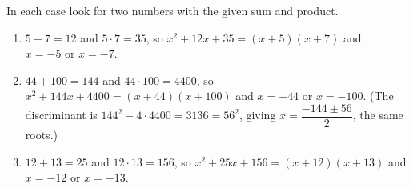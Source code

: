 In each case look for two numbers with the given sum and product.
\begin{enumerate}
\item[(a)] $5+7=12$ and $5\cdot7=35$, so $x^2+12x+35=(x+5)(x+7)$ and $\boxed{x=-5\text{ or }x=-7}$.
\item[(b)] $44+100=144$ and $44\cdot100=4400$, so $x^2+144x+4400=(x+44)(x+100)$ and $\boxed{x=-44\text{ or }x=-100}$. (The discriminant is $144^2-4\cdot4400=3136=56^2$, giving $x=\dfrac{-144\pm56}{2}$, the same roots.)
\item[(c)] $12+13=25$ and $12\cdot13=156$, so $x^2+25x+156=(x+12)(x+13)$ and $\boxed{x=-12\text{ or }x=-13}$.
\end{enumerate}
